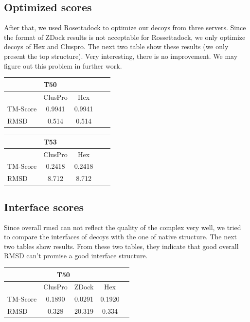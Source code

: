 \documentclass{article}
\begin{document}
\subsection{Optimized scores}

After that, we used Rosettadock to optimize our decoys from three servers. Since the format of ZDock results is not acceptable for Rossettadock, we only optimize decoys of Hex and Cluspro. The next two table show these results (we only present the top structure). Very interesting, there is no improvement. We may figure out this problem in further work.

\begin{center}
\begin{tabular}{|l|c|c|c|r|}
\multicolumn{3}{c}{T50} \\
    \hline
      & ClusPro & Hex \\ \hline
    TM-Score & 0.9941 & 0.9941 \\ \hline
    RMSD & 0.514 & 0.514 \\
    \hline
    \end{tabular}
\end{center}

\begin{center}
\begin{tabular}{|l|c|c|c|r|}
\multicolumn{3}{c}{T53} \\
    \hline
      & ClusPro & Hex \\ \hline
    TM-Score & 0.2418 & 0.2418 \\ \hline
    RMSD & 8.712 & 8.712 \\
    \hline
    \end{tabular}
\end{center}




\subsection{Interface scores}

Since overall rmsd can not reflect the quality of the complex very well, we tried to compare the interfaces of decoys with the one of native structure. The next two tables show results. From these two tables, they indicate that good overall RMSD can’t promise a good interface structure.


\begin{center}
\begin{tabular}{|l|c|c|c|r|}
\multicolumn{4}{c}{T50} \\
    \hline
      & ClusPro & ZDock & Hex \\ \hline
    TM-Score & 0.1890 & 0.0291 & 0.1920 \\ \hline
    RMSD & 0.328 & 20.319 & 0.334 \\
    \hline
    \end{tabular}
\end{center}
\end{document}
